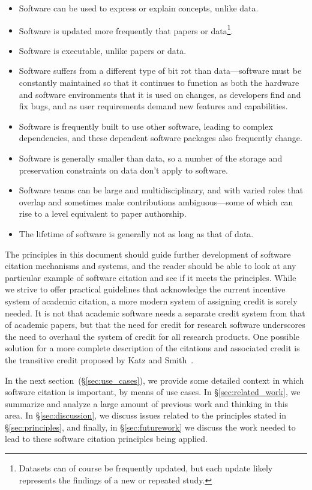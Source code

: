 \documentclass[12pt, oneside]{amsart}
\begin{document}
\begin{itemize}
\item Software can be used to express or explain concepts, unlike data.
\item Software is updated more frequently that papers or data\footnote{Datasets
can of course be frequently updated, but each update likely represents the
findings of a new or repeated study.}.
\item Software is executable, unlike papers or data.
\item Software suffers from a different type of bit rot than data---software
must be constantly maintained so that it continues to function as both the
hardware and software environments that it is used on changes, as developers
find and fix bugs, and as user requirements demand new features and capabilities.
\item Software is frequently built to use other software, leading to complex
dependencies, and these dependent software packages also frequently change.
\item Software is generally smaller than data, so a number of the storage and
preservation constraints on data don't apply to software.
\item Software teams can be large and multidisciplinary, and with varied roles
that overlap and sometimes make contributions ambiguous---some of which
can rise to a level equivalent to paper authorship.
\item The lifetime of software is generally not as long as that of data.
\end{itemize}

The principles in this document should guide further development of software citation
mechanisms and systems, and the reader should be able to look at any particular example
of software citation and see if it meets the principles.
While we strive to offer practical guidelines that acknowledge the current
incentive system of academic citation, a more modern system of assigning credit
is sorely needed. It is not that academic software needs a separate credit
system from that of academic papers, but that the need for credit for
research software underscores the need to overhaul the system of credit for
all research products. One possible solution for a more complete description of the
citations and associated credit is the transitive credit proposed by
Katz and Smith~\cite{transitive_credit_original,transitive_credit_json-ld}.

In the next section~(\S\ref{sec:use_cases}), we provide some detailed context in
which software citation is important, by means of use cases. In
\S\ref{sec:related_work}, we summarize and analyze a large amount of previous
work and thinking in this area. In \S\ref{sec:discussion}, we discuss issues
related to the principles stated in \S\ref{sec:principles}, and finally, in
\S\ref{sec:futurework} we discuss the work needed to lead to these
software citation principles being applied.
\end{document}

